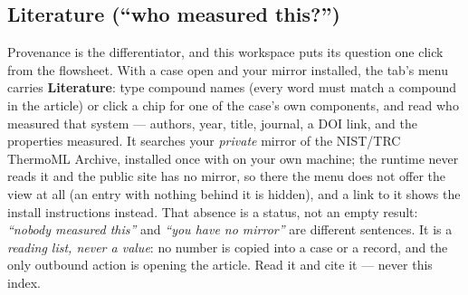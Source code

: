 \documentclass[11pt,a4paper]{article}
\begin{document}
\subsection{Literature (``who measured this?'')}
Provenance is the differentiator, and this workspace puts its question one
click from the flowsheet.  With a case open and your mirror installed, the
tab's menu carries \textbf{Literature}: type compound names (every word must match a compound
in the article) or click a chip for one of the case's own components, and
read who measured that system --- authors, year, title, journal, a DOI
link, and the properties measured.  It searches your \emph{private} mirror
of the NIST/TRC ThermoML Archive, installed once with
 on your own machine; the runtime never reads
it and the public site has no mirror, so there the menu does not offer the
view at all (an entry with nothing behind it is hidden), and a link to it
shows the install instructions instead.  That absence is a status, not an
empty result:
\emph{``nobody measured this''} and \emph{``you have no mirror''} are
different sentences.  It is a \emph{reading list, never a value}: no number
is copied into a case or a record, and the only outbound action is opening
the article.  Read it and cite it --- never this index.
\end{document}
